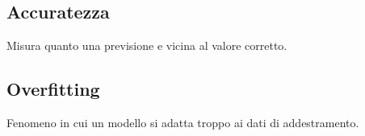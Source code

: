 \documentclass{article}
\begin{document}
\subsection{Accuratezza}
Misura quanto una previsione e vicina al valore corretto.

\subsection{Overfitting}
Fenomeno in cui un modello si adatta troppo ai dati di addestramento.
\end{document}

